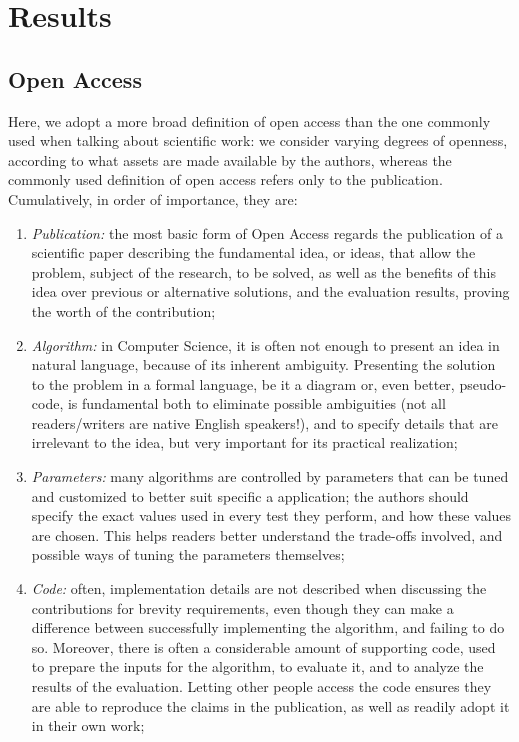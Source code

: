 \documentclass[12pt]{article}
\begin{document}
\section{Results}
\label{sec:org33c185a}

\subsection{Open Access}
\label{sec:orgeac6af3}
Here, we adopt a more broad definition of open access than the one commonly used when talking about scientific work: we consider varying degrees of openness, according to what assets are made available by the authors, whereas the commonly used definition of open access refers only to the publication. Cumulatively, in order of importance, they are:

\begin{enumerate}
\item \emph{Publication:} the most basic form of Open Access regards the publication of a scientific paper describing the fundamental idea, or ideas, that allow the problem, subject of the research, to be solved, as well as the benefits of this idea over previous or alternative solutions, and the evaluation results, proving the worth of the contribution;
\item \emph{Algorithm:} in Computer Science, it is often not enough to present an idea in natural language, because of its inherent ambiguity. Presenting the solution to the problem in a formal language, be it a diagram or, even better, pseudo-code, is fundamental both to eliminate possible ambiguities (not all readers/writers are native English speakers!), and to specify details that are irrelevant to the idea, but very important for its practical realization;
\item \emph{Parameters:} many algorithms are controlled by parameters that can be tuned and customized to better suit specific a application; the authors should specify the exact values used in every test they perform, and how these values are chosen. This helps readers better understand the trade-offs involved, and possible ways of tuning the parameters themselves;
\item \emph{Code:} often, implementation details are not described when discussing the contributions for brevity requirements, even though they can make a difference between successfully implementing the algorithm, and failing to do so. Moreover, there is often a considerable amount of supporting code, used to prepare the inputs for the algorithm, to evaluate it, and to analyze the results of the evaluation. Letting other people access the code ensures they are able to reproduce the claims in the publication, as well as readily adopt it in their own work;

\end{enumerate}
\end{document}
